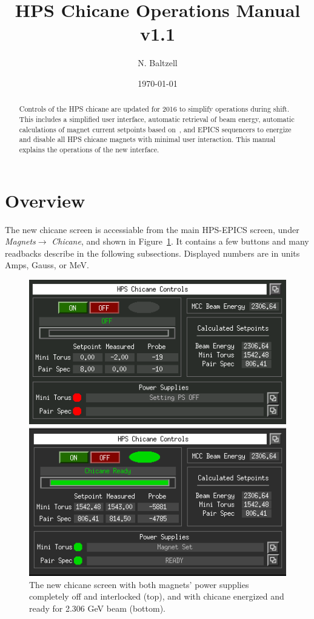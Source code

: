 \documentclass[amsmath,amssymb,notitlepage,12pt]{revtex4-1}
\begin{document}
\title{HPS Chicane Operations Manual v1.1}
\author{N. Baltzell}
\date{\today}
\begin{abstract}
    Controls of the HPS chicane are updated for 2016 to simplify operations during shift.  This includes a simplified user interface, automatic retrieval of beam energy, automatic calculations of magnet current setpoints based on~\cite{chicaneSettings}, and EPICS sequencers to energize and disable all HPS chicane magnets with minimal user interaction.  This manual explains the operations of the new interface. 
\end{abstract}

\maketitle
\tableofcontents
\newpage

\section{Overview}
The new chicane screen is accessiable from the main HPS-EPICS screen, under {\em Magnets}$ \to$ {\em Chicane}, and shown in Figure~\ref{fig:guiChicaneOff}.  It contains a few buttons and many readbacks describe in the following subsections.  Displayed numbers are in units Amps, Gauss, or MeV. 
\begin{figure}[htbp]
    \centering\includegraphics[width=12cm]{pics/gui2}

    \centering\includegraphics[width=12cm]{pics/guiON}
    \caption{The new chicane screen with both magnets' power supplies completely off and interlocked (top), and with chicane energized and ready for 2.306 GeV beam (bottom).\label{fig:guiChicaneOff}}
\end{figure}
\end{document}
